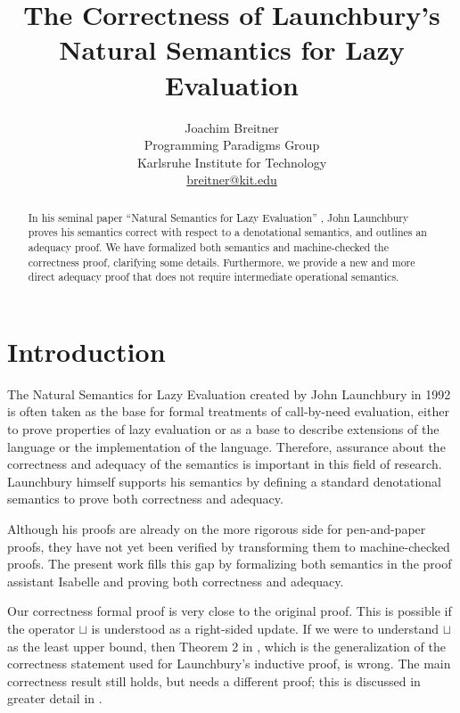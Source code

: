 \documentclass[11pt,a4paper,parskip=half]{scrartcl}
\begin{document}
\title{The Correctness of Launchbury's Natural Semantics for Lazy Evaluation}
\author{Joachim Breitner\\
Programming Paradigms Group\\
Karlsruhe Institute for Technology\\
\url{breitner@kit.edu}}
\maketitle

\begin{abstract}
In his seminal paper ``Natural Semantics for Lazy Evaluation'' \cite{launchbury},
John Launchbury proves his semantics correct with respect to a denotational
semantics, and outlines an adequacy proof.
We have formalized both semantics and machine-checked the correctness proof,
clarifying some details.
Furthermore, we provide a new and more direct adequacy proof that does not
require intermediate operational semantics.
\end{abstract}

\tableofcontents

\section{Introduction}

The Natural Semantics for Lazy Evaluation \cite{launchbury} created by John Launchbury in 1992 is often taken as the base for formal treatments of call-by-need evaluation, either to prove properties of lazy evaluation or as a base to describe extensions of the language or the implementation of the language. Therefore, assurance about the correctness and adequacy of the semantics is important in this field of research. Launchbury himself supports his semantics by defining a standard denotational semantics to prove both correctness and adequacy.

Although his proofs are already on the more rigorous side for pen-and-paper proofs, they have not yet been verified by transforming them to machine-checked proofs.
The present work fills this gap by formalizing both semantics in the proof assistant Isabelle and proving both correctness and adequacy.

Our correctness formal proof is very close to the original proof. This is possible if the operator $\sqcup$ is understood as a right-sided update. If we were to understand $\sqcup$ as the least upper bound, then Theorem 2 in \cite{launchbury}, which is the generalization of the correctness statement used for Launchbury's inductive proof, is wrong. The main correctness result still holds, but needs a different proof; this is discussed in greater detail in \cite{breitner2013}.
\end{document}
